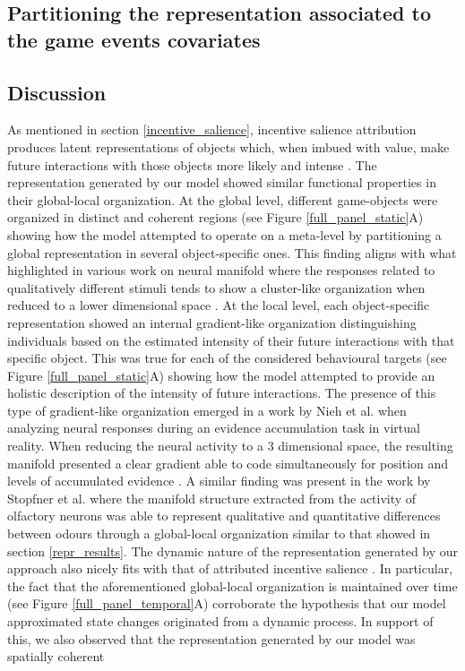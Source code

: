 \begin{figure}[ht]
\label{partition_rnn_env} 
\end{figure}

\subsection{Partitioning the representation associated to the game events covariates}
\lorem

\subsection{Discussion}
As mentioned in section  \ref{incentive_salience}, incentive salience attribution produces latent representations of objects which, when imbued with value, make future interactions with those objects more likely and intense \cite{berridge1998role,berridge2004motivation}. The representation generated by our model showed similar functional properties in their global-local organization. At the global level, different game-objects were organized in distinct and coherent regions (see Figure \ref{full_panel_static}A) showing how the model attempted to operate on a meta-level by partitioning a global representation in several object-specific ones. This finding aligns with what highlighted in various work on neural manifold where the responses related to qualitatively different stimuli tends to show a cluster-like organization when reduced to a lower dimensional space \cite{stopfer2003intensity, gallego2017neural, ganmor2015thesaurus}. At the local level, each object-specific representation showed an internal gradient-like organization distinguishing individuals based on the estimated intensity of their future interactions with that specific object. This was true for each of the considered behavioural targets (see Figure \ref{full_panel_static}A) showing how the model attempted to provide an holistic description of the intensity of future interactions. The presence of this type of gradient-like organization emerged in a work by Nieh et al. \cite{nieh2021geometry} when analyzing neural responses during an evidence accumulation task in virtual reality. When reducing the neural activity to a 3 dimensional space, the resulting manifold presented a clear gradient able to code simultaneously for position and levels of accumulated evidence \cite{nieh2021geometry}. A similar finding was present in the work by Stopfner et al. \cite{stopfer2003intensity} where the manifold structure extracted from the activity of olfactory neurons was able to represent qualitative and quantitative differences between odours through a global-local organization similar to that showed in section \ref{repr_results}. The dynamic nature of the representation generated by our approach also nicely fits with that of attributed incentive salience \cite{toates1994comparing,robinson1993neural,zhang2009neural,tindell2009dynamic,berridge2012prediction}. In particular, the fact that the aforementioned global-local organization is maintained over time (see Figure \ref{full_panel_temporal}A) corroborate the hypothesis that our model approximated state changes originated from a dynamic process. In support of this, we also observed that the representation generated by our model was spatially coherent 